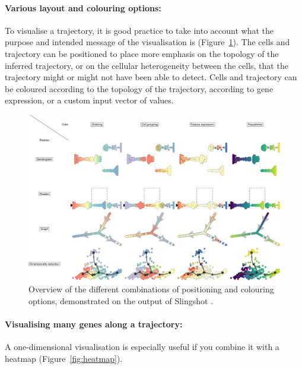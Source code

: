 \paragraph{Various layout and colouring options:} To visualise a trajectory, it is good practice to take into account what the purpose and intended message of the visualisation is (Figure~\ref{fig:cells}).
The cells and trajectory can be positioned to place more emphasis on the topology of the inferred trajectory, or on the cellular heterogeneity between the cells, that the trajectory might or might not have been able to detect. Cells and trajectory can be coloured according to the
topology of the trajectory, according to gene expression, or a custom
input vector of values.

\begin{figure}[ht!]
	\centering
	\includegraphics{manuscript_files/figure-latex/cells-1.pdf}
	\caption{Overview of the different combinations of positioning and
		colouring options, demonstrated on the output of Slingshot \cite{street_slingshotcelllineage_2018}.}
	\label{fig:cells}
\end{figure}


\paragraph{Visualising many genes along a trajectory:}
A one-dimensional visualisation is especially useful if you combine it
with a heatmap (Figure~\ref{fig:heatmap}).

